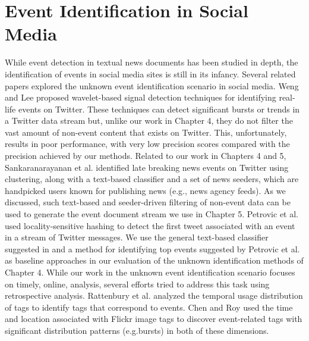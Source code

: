 \section{Event Identification in Social Media}
While event detection in textual news documents has been studied in depth, the identification
of events in social media sites is still in its infancy. Several related papers explored the unknown event identification scenario in social media.
Weng and Lee \cite{weng2011event} proposed wavelet-based signal detection techniques for identifying
real-life events on Twitter. These techniques can detect significant bursts or trends
in a Twitter data stream but, unlike our work in Chapter 4, they do not filter the vast
amount of non-event content that exists on Twitter. This, unfortunately, results in poor
performance, with very low precision scores compared with the precision achieved by our
methods. Related to our work in Chapters 4 and 5, Sankaranarayanan et al. \cite{sankaranarayanan2009twitterstand}
identified late breaking news events on Twitter using clustering, along with a text-based
classifier and a set of news seeders,  which are handpicked users known for publishing news
(e.g., news agency feeds). As we discussed, such text-based and seeder-driven filtering of
non-event data can be used to generate the event document stream we use in Chapter 5.
Petrovic et al. \cite{petrovic2010streaming} used locality-sensitive hashing to detect the first tweet associated with an event in a stream of Twitter messages. We use the general text-based classifier suggested in \cite{sankaranarayanan2009twitterstand} and a method for identifying top events suggested by Petrovic et
al. \cite{petrovic2010streaming} as baseline approaches in our evaluation of the unknown identification methods
of Chapter 4. While our work in the unknown event identification scenario focuses on timely, online, analysis, several efforts tried to address this task using retrospective analysis. Rattenbury et al. \cite{rattenbury2007towards} analyzed the temporal usage distribution of tags to identify tags that correspond
to events. Chen and Roy \cite{chen2009event} used the time and location associated with Flickr image
tags to discover event-related tags with significant distribution patterns (e.g.bursts) in
both of these dimensions.

